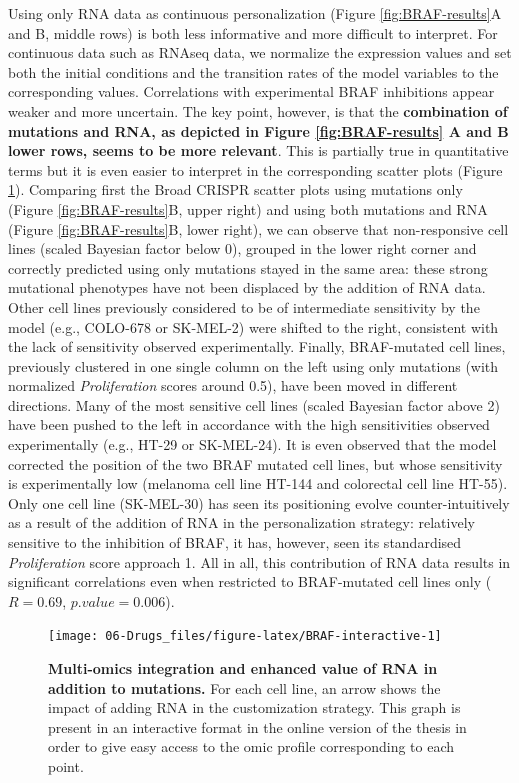 \documentclass[a4paper,12pt,twoside,onecolumn,openright,final,oldfontcommands]{memoir}
\begin{document}
Using only RNA data as continuous personalization (Figure
\ref{fig:BRAF-results}A and B, middle rows) is both less informative and
more difficult to interpret. For continuous data such as RNAseq data, we
normalize the expression values and set both the initial conditions and
the transition rates of the model variables to the corresponding values.
Correlations with experimental BRAF inhibitions appear weaker and more
uncertain. The key point, however, is that the \textbf{combination of
mutations and RNA, as depicted in Figure \ref{fig:BRAF-results} A and B
lower rows, seems to be more relevant}. This is partially true in
quantitative terms but it is even easier to interpret in the
corresponding scatter plots (Figure \ref{fig:BRAF-interactive}).
Comparing first the Broad CRISPR scatter plots using mutations only
(Figure \ref{fig:BRAF-results}B, upper right) and using both mutations
and RNA (Figure \ref{fig:BRAF-results}B, lower right), we can observe
that non-responsive cell lines (scaled Bayesian factor below 0), grouped
in the lower right corner and correctly predicted using only mutations
stayed in the same area: these strong mutational phenotypes have not
been displaced by the addition of RNA data. Other cell lines previously
considered to be of intermediate sensitivity by the model (e.g.,
COLO-678 or SK-MEL-2) were shifted to the right, consistent with the
lack of sensitivity observed experimentally. Finally, BRAF-mutated cell
lines, previously clustered in one single column on the left using only
mutations (with normalized \emph{Proliferation} scores around 0.5), have
been moved in different directions. Many of the most sensitive cell
lines (scaled Bayesian factor above 2) have been pushed to the left in
accordance with the high sensitivities observed experimentally (e.g.,
HT-29 or SK-MEL-24). It is even observed that the model corrected the
position of the two BRAF mutated cell lines, but whose sensitivity is
experimentally low (melanoma cell line HT-144 and colorectal cell line
HT-55). Only one cell line (SK-MEL-30) has seen its positioning evolve
counter-intuitively as a result of the addition of RNA in the
personalization strategy: relatively sensitive to the inhibition of
BRAF, it has, however, seen its standardised \emph{Proliferation} score
approach 1. All in all, this contribution of RNA data results in
significant correlations even when restricted to BRAF-mutated cell lines
only (\(R=0.69\), \(p.value=0.006\)).

\begin{figure}

{\centering \texttt{[image: 06-Drugs\_files/figure-latex/BRAF-interactive-1]} 

}

\caption[Interactive]{\textbf{Multi-omics integration and
enhanced value of RNA in addition to mutations.} For each cell line, an
arrow shows the impact of adding RNA in the customization strategy. This
graph is present in an interactive format in the online version of the
thesis in order to give easy access to the omic profile corresponding to
each point.}\label{fig:BRAF-interactive}
\end{figure}
\end{document}
